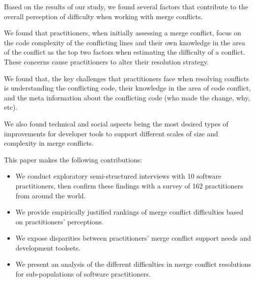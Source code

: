 Based on the results of our study, we found several factors that contribute to the overall perception of difficulty when working with merge conflicts.

We found that practitioners, when initially assessing a merge conflict, focus on the code complexity of the conflicting lines and their own knowledge in the area of the conflict as the top two factors when estimating the difficulty of a conflict. These concerns cause practitioners to alter their resolution strategy.

We found that, the key challenges that practitioners face when resolving conflicts is understanding the conflicting code, their knowledge in the area of code conflict, and the meta information about the conflicting code (who made the change, why, etc).

We also found technical and social aspects being the most desired types of improvements for developer tools to support different scales of size and complexity in merge conflicts.

This paper makes the following contributions:
\begin{itemize}
\item We conduct exploratory semi-structured interviews with 10 software practitioners, then confirm these findings with a survey of 162 practitioners from around the world.
\item We provide empirically justified rankings of merge conflict difficulties based on practitioners' perceptions.
\item We expose disparities between practitioners' merge conflict support needs and development toolsets.
\item We present an analysis of the different difficulties in merge conflict resolutions for sub-populations of software practitioners.
\end{itemize}